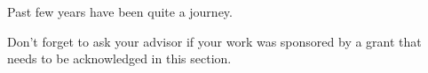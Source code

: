 Past few years have been quite a journey.





Don't forget to ask your advisor if your work was sponsored by a grant that needs to be acknowledged in this section.  